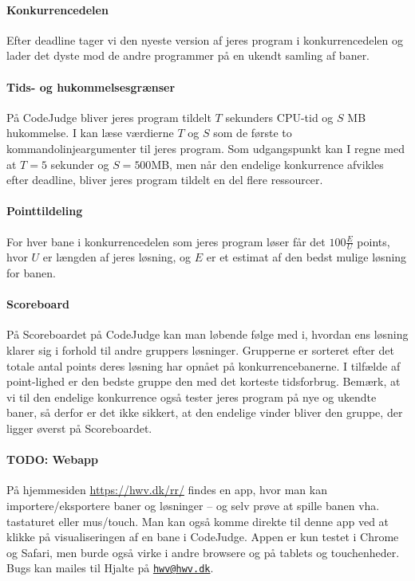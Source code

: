 \documentclass[10pt, a4paper]{article}
\begin{document}
\paragraph{Konkurrencedelen} Efter deadline tager vi den nyeste version af jeres program i konkurrencedelen og lader det dyste mod de andre programmer på en ukendt samling af baner.

\paragraph{Tids- og hukommelsesgrænser} På CodeJudge bliver jeres program tildelt $T$ sekunders CPU-tid og $S$ MB hukommelse. I kan læse værdierne $T$ og $S$ som de første to kommandolinjeargumenter til jeres program. Som udgangspunkt kan I regne med at $T=5$ sekunder og $S=500$MB, men når den endelige konkurrence afvikles efter deadline, bliver jeres program tildelt en del flere ressourcer.

\paragraph{Pointtildeling} For hver bane i konkurrencedelen som jeres program løser får det $100 \frac{E}{U}$ points, hvor $U$ er længden af jeres løsning, og $E$ er et estimat af den bedst mulige løsning for banen.

\paragraph{Scoreboard} På Scoreboardet på CodeJudge kan man løbende følge med i, hvordan ens løsning klarer sig i forhold til andre gruppers løsninger.
Grupperne er sorteret efter det totale antal points deres løsning har opnået på konkurrencebanerne.
I tilfælde af point-lighed er den bedste gruppe den med det korteste tidsforbrug.
Bemærk, at vi til den endelige konkurrence også tester jeres program på nye og ukendte baner, så derfor er det ikke sikkert, at den endelige vinder bliver den gruppe, der ligger øverst på Scoreboardet.

\paragraph{TODO: Webapp} På hjemmesiden \url{https://hwv.dk/rr/} findes en app, hvor man kan importere/eksportere baner og løsninger -- og selv prøve at spille banen vha. tastaturet eller mus/touch. Man kan også komme direkte til denne app ved at klikke på visualiseringen af en bane i CodeJudge. Appen er kun testet i Chrome og Safari, men burde også virke i andre browsere og på tablets og touchenheder. Bugs kan mailes til Hjalte på \href{mailto:hwv@hwv.dk}{\texttt{hwv@hwv.dk}}.
\end{document}
